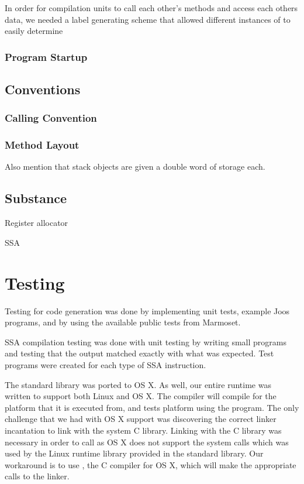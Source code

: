 \documentclass[pdftex,11pt,a4paper]{article}
\begin{document}
In order for compilation units to call each other's methods and access
each others data, we needed a label generating scheme that allowed
different instances of  to easily determine



\subsubsection{Program Startup}


\subsection{Conventions}

\subsubsection{Calling Convention}

\subsubsection{Method Layout}

Also mention that stack objects are given a double word of storage each.


\subsection{Substance}

Register allocator

SSA


\section{Testing}

Testing for code generation was done by implementing unit tests,
example Joos programs, and by using the available public tests from
Marmoset.

SSA compilation testing was done with unit testing by writing small
programs and testing that the output matched exactly with what was
expected. Test programs were created for each type of SSA
instruction.

The standard library  was ported to OS X. As well, our
entire runtime was written to support both  Linux and  OS
X. The compiler will compile for the platform that it is executed
from, and tests platform using the  program. The only
challenge that we had with OS X support was discovering the correct
linker incantation to link with the system C library. Linking with the
C library was necessary in order to call  as OS X does not
support the system calls which was used by the Linux runtime library
provided in the standard library. Our workaround is to use
, the C compiler for OS X, which will make the appropriate
calls to the linker.
\end{document}
